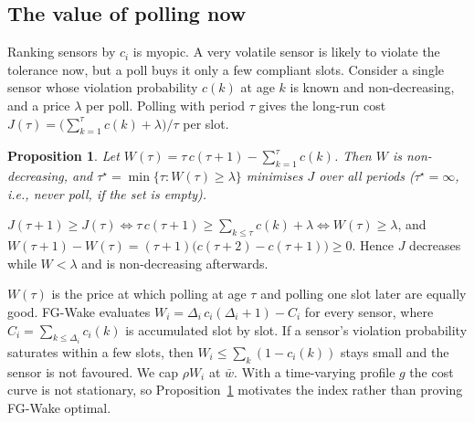 \documentclass[conference]{IEEEtran}
\newtheorem{proposition}{Proposition}
\begin{document}
\subsection{The value of polling now}
Ranking sensors by $c_i$ is myopic. A very volatile sensor is likely to violate
the tolerance now, but a poll buys it only a few compliant slots. Consider a
single sensor whose violation probability $c(k)$ at age $k$ is known and
non-decreasing, and a price $\lambda$ per poll. Polling with period $\tau$
gives the long-run cost $J(\tau)=\big(\sum_{k=1}^{\tau}c(k)+\lambda\big)/\tau$ per
slot.
\begin{proposition}\label{prop:index}
Let $W(\tau)=\tau\,c(\tau+1)-\sum_{k=1}^{\tau}c(k)$. Then $W$ is non-decreasing,
and $\tau^\star=\min\{\tau: W(\tau)\ge\lambda\}$ minimises $J$ over all
periods ($\tau^\star=\infty$, i.e., never poll, if the set is empty).
\end{proposition}
\begin{IEEEproof}
$J(\tau+1)\ge J(\tau)\iff \tau\,c(\tau+1)\ge\sum_{k\le\tau}c(k)+\lambda\iff W(\tau)\ge\lambda$,
and $W(\tau+1)-W(\tau)=(\tau+1)\big(c(\tau+2)-c(\tau+1)\big)\ge0$. Hence $J$
decreases while $W<\lambda$ and is non-decreasing afterwards.
\end{IEEEproof}
$W(\tau)$ is the price at which polling at age $\tau$ and polling one slot later
are equally good. FG-Wake evaluates $W_i=\Delta_i\,c_i(\Delta_i+1)-C_i$ for every
sensor, where $C_i=\sum_{k\le\Delta_i}c_i(k)$ is accumulated slot by slot. If a
sensor's violation probability saturates within a few slots, then
$W_i\le\sum_k(1-c_i(k))$ stays small and the sensor is not favoured. We cap
$\rho W_i$ at $\bar w$. With a time-varying profile $g$ the cost curve is not
stationary, so Proposition~\ref{prop:index} motivates the index rather than proving
FG-Wake optimal.
\end{document}
